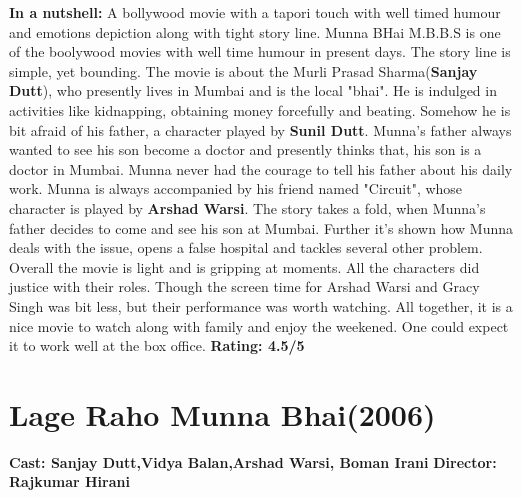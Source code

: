 \documentclass{article}
\begin{document}
\newline
\newline
\textbf{In a nutshell: } A bollywood movie with a tapori touch with well timed humour and emotions depiction along with tight story line.
\newline
Munna BHai M.B.B.S is one of the boolywood movies with well time humour in present days. The story line is simple, yet bounding. The movie is about the Murli Prasad Sharma(\textbf{Sanjay Dutt}), who presently lives in Mumbai and is the local "bhai". He is indulged in activities like kidnapping, obtaining money forcefully and beating. Somehow he is bit afraid of his father, a character played by \textbf{Sunil Dutt}. Munna's father always wanted to see his son become a doctor and presently thinks that, his son is a doctor in Mumbai. Munna never had the courage to tell his father about his daily work. Munna is always accompanied by his friend named "Circuit", whose character is played by \textbf{Arshad Warsi}. The story takes a fold, when Munna's father decides to come and see his son at Mumbai. Further it's shown how Munna deals with the issue, opens a false hospital and tackles several other problem. \newline
Overall the movie is light and is gripping at moments. All the characters did justice with their roles. Though the screen time for Arshad Warsi and Gracy Singh was bit less, but their performance was worth watching. All together, it is a nice movie to watch along with family and enjoy the weekened. One could expect it to work well at the box office.
\newline
\textbf{Rating: 4.5/5}


\section{Lage Raho Munna Bhai(2006)}

\textbf{Cast: Sanjay Dutt,Vidya Balan,Arshad Warsi, Boman Irani}
\textbf{Director: Rajkumar Hirani }  
\end{document}
